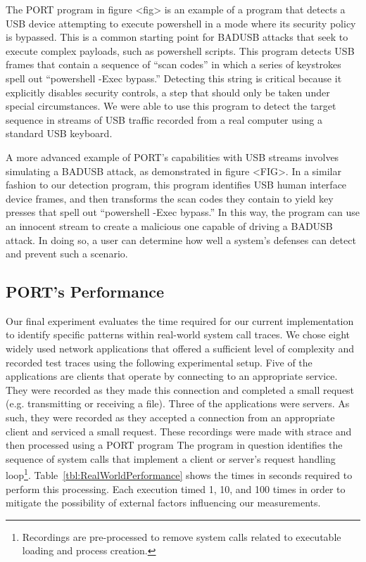 The PORT program in figure <fig> is an example of a program that detects a USB device attempting to execute powershell
in a mode where its security policy is bypassed.
This is a common starting point for BADUSB attacks that seek to execute complex payloads, such as powershell scripts.
This program detects USB frames that contain a sequence of ``scan codes'' in which a series of keystrokes spell out ``powershell -Exec bypass.''
Detecting this string is critical because it explicitly disables security controls, a step that should only be taken under special circumstances.
We were able to use this program to detect the target sequence in streams of USB traffic recorded from a real computer using a standard USB keyboard.

A more advanced example of PORT's capabilities with USB streams involves simulating a BADUSB attack, as demonstrated in figure <FIG>.
In a similar fashion to our detection program, this program identifies USB human interface device frames, and then transforms the scan codes they contain to yield key presses that spell out ``powershell -Exec bypass.''
In this way, the program can use an innocent stream to create a malicious one capable of driving a BADUSB attack. In doing so, a user can determine how well a system's defenses can detect and prevent such a scenario.


\subsection{PORT's Performance}

Our final experiment evaluates the
time required for our current implementation
to identify specific
patterns within real-world system call traces.
We chose eight widely used network applications that offered a sufficient level of complexity
and recorded test traces using the following 
experimental setup.
Five of the applications are clients that operate by connecting to an appropriate service. They were recorded as they made this connection and completed a small request (e.g. transmitting or receiving a file).
Three of the applications were servers.  As such, they were recorded as they accepted a connection from an appropriate client and serviced a small request.
These recordings were made with strace
and then processed using a PORT program
The program in question
identifies the sequence of system calls that implement
a client or server's request handling loop\footnote{Recordings are pre-processed to remove system calls
related to executable loading and process creation.}.  Table~\ref{tbl:RealWorldPerformance}
shows the times in seconds required to perform this processing.
Each execution timed 1, 10, and 100 times in order to mitigate the
possibility of external factors influencing our measurements.

